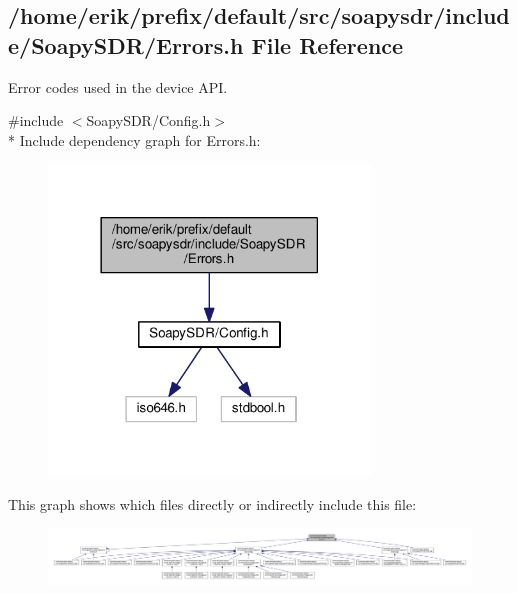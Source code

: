 \subsection{/home/erik/prefix/default/src/soapysdr/include/\+Soapy\+S\+D\+R/\+Errors.h File Reference}
\label{Errors_8h}


Error codes used in the device A\+PI.  


{\ttfamily \#include $<$Soapy\+S\+D\+R/\+Config.\+h$>$}\\*
Include dependency graph for Errors.\+h\+:
\nopagebreak
\begin{figure}[H]
\begin{center}
\leavevmode
\includegraphics[width=242pt]{d7/dc9/Errors_8h__incl}
\end{center}
\end{figure}
This graph shows which files directly or indirectly include this file\+:
\nopagebreak
\begin{figure}[H]
\begin{center}
\leavevmode
\includegraphics[width=350pt]{d3/df9/Errors_8h__dep__incl}
\end{center}
\end{figure}
